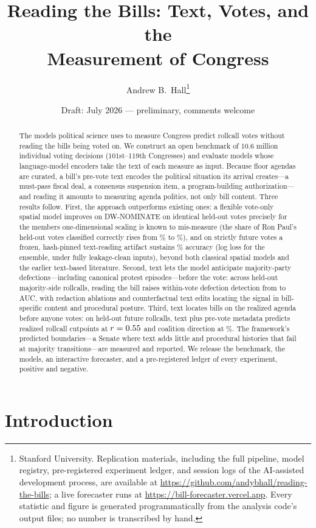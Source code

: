 \documentclass[12pt]{article}
\title{Reading the Bills: Text, Votes, and the\\ Measurement of Congress}
\author{Andrew B.\ Hall\thanks{Stanford University. Replication materials,
including the full pipeline, model registry, pre-registered experiment
ledger, and session logs of the AI-assisted development process, are
available at \url{https://github.com/andybhall/reading-the-bills}; a live
forecaster runs at \url{https://bill-forecaster.vercel.app}. Every
statistic and figure is generated programmatically from the analysis
code's output files; no number is transcribed by hand.}}
\date{Draft: July 2026 --- preliminary, comments welcome}
\begin{document}
\maketitle
\onehalfspacing

\begin{abstract}
\noindent The models political science uses to measure Congress
predict rollcall votes without reading the bills being voted on. We
construct an open benchmark of 10.6 million individual voting
decisions (101st--119th Congresses) and evaluate models whose
language-model encoders take the text of each measure as input.
Because floor agendas are curated, a bill's pre-vote text encodes the
political situation its arrival creates---a must-pass fiscal deal, a
consensus suspension item, a program-building authorization---and
reading it amounts to measuring agenda politics, not only bill
content. Three results follow. First, the approach outperforms
existing ones: a flexible vote-only spatial model improves on
DW-NOMINATE on identical held-out votes precisely for the members
one-dimensional scaling is known to mis-measure (the share of Ron
Paul's held-out votes classified correctly rises from \paulCCnom\% to
\paulCCours\%), and on
strictly future votes a frozen, hash-pinned text-reading artifact
sustains \champForecastAcc\% accuracy (log loss \champForecastLL{}
for the ensemble, \incForecastLL{} under fully leakage-clean inputs),
beyond both classical spatial models and the earlier text-based
literature. Second, text lets the model anticipate majority-party
defections---including canonical protest episodes---before the vote:
across \protRC{} held-out majority-side rollcalls, reading the bill
raises within-vote defection detection from \protAUCnotext{} to
\protAUCtext{} AUC, with redaction ablations and counterfactual text
edits locating the signal in bill-specific content and procedural
posture. Third, text locates bills on the realized agenda before
anyone votes: on \cutTestN{} held-out future rollcalls, text plus
pre-vote metadata predicts realized rollcall cutpoints at
$r = 0.55$ and coalition direction at \dirCombo\%. The
framework's predicted boundaries---a Senate where text adds little
and procedural histories that fail at majority transitions---are
measured and reported. We release the benchmark, the models, an
interactive forecaster, and a pre-registered ledger of every
experiment, positive and negative.
\end{abstract}

\section{Introduction}
\end{document}
